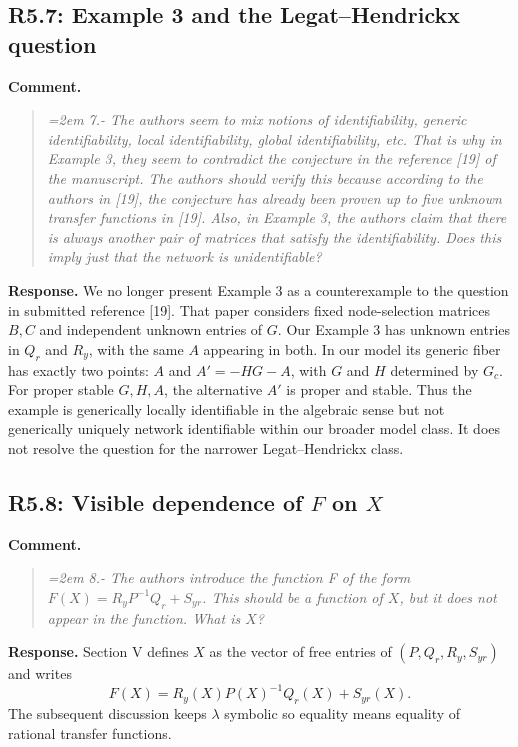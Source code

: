 \documentclass[11pt]{article}
\begin{document}
\subsection*{R5.7: Example 3 and the Legat--Hendrickx question}
\textbf{Comment.}
\begin{quote}\itshape\emergencystretch=2em
7.- The authors seem to mix notions of identifiability, generic identifiability, local identifiability, global identifiability, etc. That is why in Example 3, they seem to contradict the conjecture in the reference [19] of the manuscript. The authors should verify this because according to the authors in [19], the conjecture has already been proven up to five unknown transfer functions in [19]. Also, in Example 3, the authors claim that there is always another pair of matrices that satisfy the identifiability. Does this imply just that the network is unidentifiable?
\end{quote}

\textbf{Response.} We no longer present Example 3 as a counterexample to
the question in submitted reference [19]. That paper considers fixed
node-selection matrices $B,C$ and independent unknown entries of $G$.
Our Example 3 has unknown entries in $Q_r$ and $R_y$, with the same $A$
appearing in both. In our model its generic fiber has exactly two
points: $A$ and $A'=-HG-A$, with $G$ and $H$ determined by $G_c$.
For proper stable $G,H,A$, the alternative $A'$ is proper and stable.
Thus the example is generically locally identifiable in the algebraic
sense but not generically uniquely network identifiable within our
broader model class. It does not resolve the question for the narrower
Legat--Hendrickx class.

\subsection*{R5.8: Visible dependence of $F$ on $X$}
\textbf{Comment.}
\begin{quote}\itshape\emergencystretch=2em
8.- The authors introduce the function F of the form $F(X)=R_yP^{-1}Q_r+S_{yr}$. This should be a function of $X$, but it does not appear in the function. What is $X$?
\end{quote}

\textbf{Response.} Section V defines $X$ as the vector of free entries of
$(P,Q_r,R_y,S_{yr})$ and writes
\[
F(X)=R_y(X)P(X)^{-1}Q_r(X)+S_{yr}(X).
\]
The subsequent discussion keeps $\lambda$ symbolic so equality means
equality of rational transfer functions.
\end{document}
